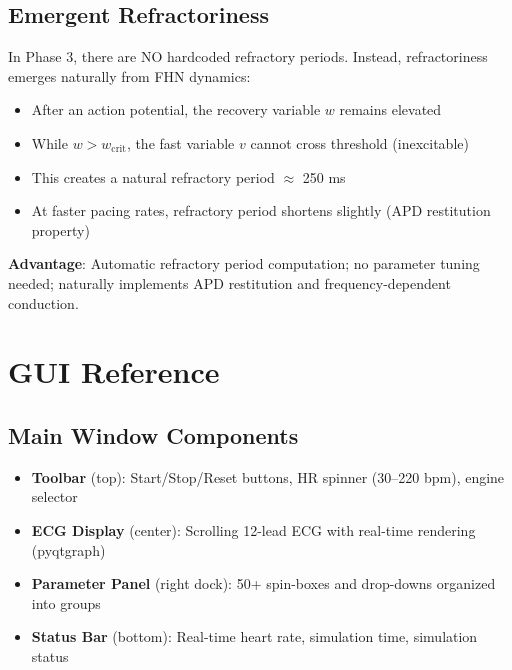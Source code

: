 \documentclass[12pt]{book}
\begin{document}
\section{Emergent Refractoriness}

In Phase 3, there are NO hardcoded refractory periods. Instead, refractoriness emerges naturally from FHN dynamics:

\begin{itemize}
  \item After an action potential, the recovery variable $w$ remains elevated
  \item While $w > w_{\text{crit}}$, the fast variable $v$ cannot cross threshold (inexcitable)
  \item This creates a natural refractory period $\approx$ 250 ms
  \item At faster pacing rates, refractory period shortens slightly (APD restitution property)
\end{itemize}

\textbf{Advantage}: Automatic refractory period computation; no parameter tuning needed; naturally implements APD restitution and frequency-dependent conduction.


\chapter{GUI Reference}

\section{Main Window Components}

\begin{itemize}
  \item \textbf{Toolbar} (top): Start/Stop/Reset buttons, HR spinner (30--220 bpm), engine selector
  
  \item \textbf{ECG Display} (center): Scrolling 12-lead ECG with real-time rendering (pyqtgraph)
  
  \item \textbf{Parameter Panel} (right dock): 50+ spin-boxes and drop-downs organized into groups
  
  \item \textbf{Status Bar} (bottom): Real-time heart rate, simulation time, simulation status
\end{itemize}
\end{document}
